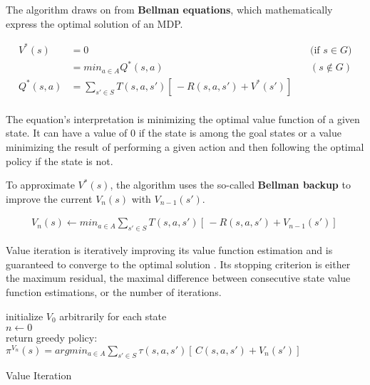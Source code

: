 The algorithm draws on from \textbf{Bellman equations}, which mathematically express the optimal solution of an MDP.

\begin{equation}
\begin{aligned}
V^* (s) & = 0 && \text{(if $s \in G$)} \\
& = min_{a \in A} Q^* (s, a) &&  (s \notin G) \\ 
Q^* (s, a) & = \sum_{s' \in S} T(s, a, s')[ \,-R(s, a, s') + V^*(s')] \, \\
\end{aligned}
\end{equation}

The equation's interpretation is minimizing the optimal value function of a given state. It can have a value of 0 if the state is among the goal states or a value minimizing the result of performing a given action and then following the optimal policy if the state is not.

To approximate $V^* (s)$, the algorithm uses the so-called \textbf{Bellman backup} to improve the current $V_n (s)$ with $V_{n-1} (s')$.


\begin{equation}
\begin{aligned}
V_n (s) \xleftarrow{} min_{a \in A} \sum_{s' \in S} T(s, a, s') [ \,-R(s, a, s') + V_{n - 1} (s')] \,
\end{aligned}
\end{equation}

Value iteration is iteratively improving its value function estimation and is guaranteed to converge to the optimal solution \cite{Kolobov2012}. Its stopping criterion is either the maximum residual, the maximal difference between consecutive state value function estimations, or the number of iterations.

\LinesNumbered
\begin{algorithm}
\SetAlgoLined
initialize $V_0$ arbitrarily for each state \\
$n \xleftarrow{} 0$ \\ 
return greedy policy: $\pi^{V_n} (s) = argmin_{a \in A} \sum_{s' \in S} \tau(s, a, s')[ \,C(s, a, s') + V_n (s')] \,$
\caption{Value Iteration}
\end{algorithm}


